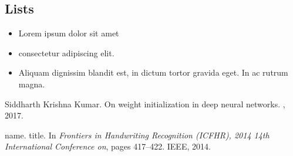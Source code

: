 \documentclass{article}
\begin{document}
\subsection{Lists}
\begin{itemize}
\item Lorem ipsum dolor sit amet
\item consectetur adipiscing elit. 
\item Aliquam dignissim blandit est, in dictum tortor gravida eget. In ac rutrum magna.
\end{itemize}


  


\begin{thebibliography}{1}

Siddharth Krishna Kumar.
\newblock On weight initialization in deep neural networks.
, 2017.

name.
\newblock title.
\newblock In {\em Frontiers in Handwriting Recognition (ICFHR), 2014 14th
  International Conference on}, pages 417--422. IEEE, 2014.

\end{thebibliography}
\end{document}
